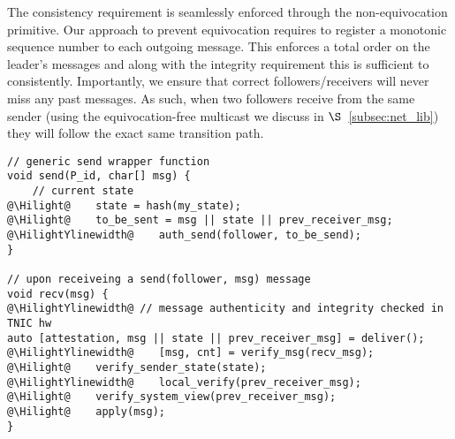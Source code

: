 The consistency requirement is seamlessly enforced  through the \projecttitle{} non-equivocation primitive. Our approach to prevent equivocation requires \projecttitle{} to  register a monotonic sequence number to each outgoing message. This enforces a total order on the leader's messages and along with the integrity requirement this is sufficient to consistently. Importantly, we ensure that correct followers/receivers will never miss any past messages. As such, when two followers receive from the same sender (using the equivocation-free multicast we discuss in $\S$~\ref{subsec:net_lib}) they will follow the exact same transition path. %



{\small
\begin{lstlisting}[frame=h,style=customc,
                    label={lst:transformation},
                    caption= Generic application send and recv wrapper functions for transformation using \projecttitle{}: blue sections (native) and orange sections (\projecttitle additions).]
// generic send wrapper function
void send(P_id, char[] msg) {
    // current state
@\Hilight@    state = hash(my_state);
@\Hilight@    to_be_sent = msg || state || prev_receiver_msg;
@\HilightYlinewidth@    auth_send(follower, to_be_send);
}

// upon receiveing a send(follower, msg) message
void recv(msg) {
@\HilightYlinewidth@ // message authenticity and integrity checked in TNIC hw
auto [attestation, msg || state || prev_receiver_msg] = deliver();
@\HilightYlinewidth@    [msg, cnt] = verify_msg(recv_msg);
@\Hilight@    verify_sender_state(state);
@\HilightYlinewidth@    local_verify(prev_receiver_msg);
@\Hilight@    verify_system_view(prev_receiver_msg);
@\Hilight@    apply(msg);
}
\end{lstlisting}
}